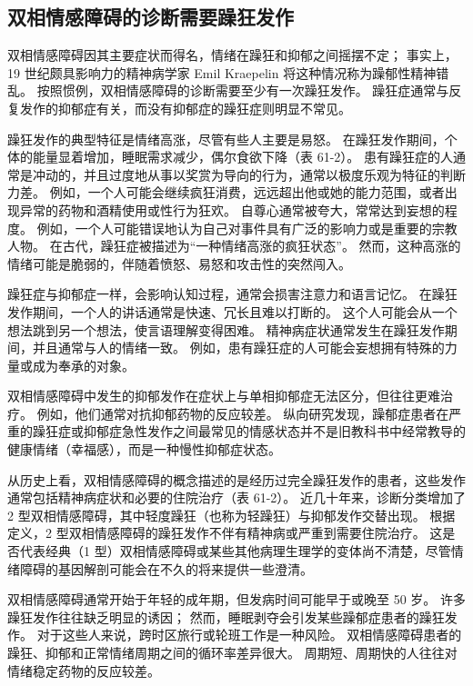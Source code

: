 \subsection{双相情感障碍的诊断需要躁狂发作}

双相情感障碍因其主要症状而得名，情绪在躁狂和抑郁之间摇摆不定；
事实上，19 世纪颇具影响力的精神病学家 Emil Kraepelin 将这种情况称为躁郁性精神错乱。
按照惯例，双相情感障碍的诊断需要至少有一次躁狂发作。
躁狂症通常与反复发作的抑郁症有关，而没有抑郁症的躁狂症则明显不常见。


躁狂发作的典型特征是情绪高涨，尽管有些人主要是易怒。
在躁狂发作期间，个体的能量显着增加，睡眠需求减少，偶尔食欲下降（表 61-2）。
患有躁狂症的人通常是冲动的，并且过度地从事以奖赏为导向的行为，通常以极度乐观为特征的判断力差。
例如，一个人可能会继续疯狂消费，远远超出他或她的能力范围，或者出现异常的药物和酒精使用或性行为狂欢。
自尊心通常被夸大，常常达到妄想的程度。
例如，一个人可能错误地认为自己对事件具有广泛的影响力或是重要的宗教人物。 在古代，躁狂症被描述为“一种情绪高涨的疯狂状态”。
然而，这种高涨的情绪可能是脆弱的，伴随着愤怒、易怒和攻击性的突然闯入。


躁狂症与抑郁症一样，会影响认知过程，通常会损害注意力和语言记忆。
在躁狂发作期间，一个人的讲话通常是快速、冗长且难以打断的。
这个人可能会从一个想法跳到另一个想法，使言语理解变得困难。
精神病症状通常发生在躁狂发作期间，并且通常与人的情绪一致。
例如，患有躁狂症的人可能会妄想拥有特殊的力量或成为奉承的对象。


双相情感障碍中发生的抑郁发作在症状上与单相抑郁症无法区分，但往往更难治疗。
例如，他们通常对抗抑郁药物的反应较差。
纵向研究发现，躁郁症患者在严重的躁狂症或抑郁症急性发作之间最常见的情感状态并不是旧教科书中经常教导的健康情绪（幸福感），而是一种慢性抑郁症状态。


从历史上看，双相情感障碍的概念描述的是经历过完全躁狂发作的患者，这些发作通常包括精神病症状和必要的住院治疗（表 61-2）。
近几十年来，诊断分类增加了 2 型双相情感障碍，其中轻度躁狂（也称为轻躁狂）与抑郁发作交替出现。
根据定义，2 型双相情感障碍的躁狂发作不伴有精神病或严重到需要住院治疗。
这是否代表经典（1 型）双相情感障碍或某些其他病理生理学的变体尚不清楚，尽管情绪障碍的基因解剖可能会在不久的将来提供一些澄清。


双相情感障碍通常开始于年轻的成年期，但发病时间可能早于或晚至 50 岁。
许多躁狂发作往往缺乏明显的诱因；
然而，睡眠剥夺会引发某些躁郁症患者的躁狂发作。
对于这些人来说，跨时区旅行或轮班工作是一种风险。
双相情感障碍患者的躁狂、抑郁和正常情绪周期之间的循环率差异很大。
周期短、周期快的人往往对情绪稳定药物的反应较差。



